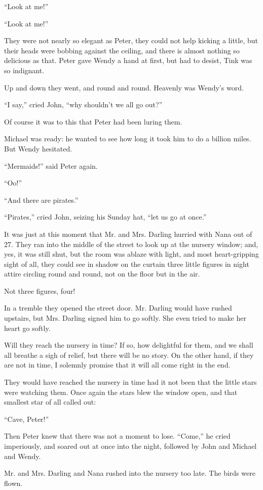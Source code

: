 ``Look at me!''

``Look at me!''

They were not nearly so elegant as Peter, they could not help kicking a little,
but their heads were bobbing against the ceiling, and there is almost nothing so
delicious as that.
Peter gave Wendy a hand at first, but had to desist, Tink was so indignant.

Up and down they went, and round and round.
Heavenly was Wendy's word.

``I say,'' cried John, ``why shouldn't we all go out?''

Of course it was to this that Peter had been luring them.

Michael was ready: he wanted to see how long it took him to do a billion miles.
But Wendy hesitated.

``Mermaids!'' said Peter again.

``Oo!''

``And there are pirates.''

``Pirates,'' cried John, seizing his Sunday hat, ``let us go at once.''

It was just at this moment that Mr. and Mrs. Darling hurried with Nana out of
27.
They ran into the middle of the street to look up at the nursery window; and,
yes, it was still shut, but the room was ablaze with light, and most
heart-gripping sight of all, they could see in shadow on the curtain three
little figures in night attire circling round and round, not on the floor but in
the air.

Not three figures, four!

In a tremble they opened the street door.
Mr. Darling would have rushed upstairs, but Mrs. Darling signed him to go
softly.
She even tried to make her heart go softly.

Will they reach the nursery in time?
If so, how delightful for them, and we shall all breathe a sigh of relief, but
there will be no story.
On the other hand, if they are not in time, I solemnly promise that it will all
come right in the end.

They would have reached the nursery in time had it not been that the little
stars were watching them.
Once again the stars blew the window open, and that smallest star of all called
out:

``Cave, Peter!''

Then Peter knew that there was not a moment to lose.
``Come,'' he cried imperiously, and soared out at once into the night, followed
by John and Michael and Wendy.

Mr. and Mrs. Darling and Nana rushed into the nursery too late.
The birds were flown.